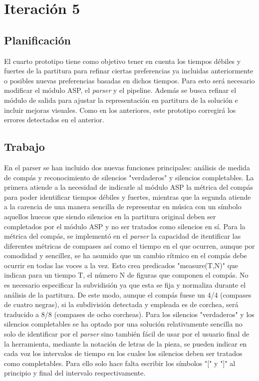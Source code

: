 \section{Iteración 5}
\subsection{Planificación}
El cuarto prototipo tiene como objetivo tener en cuenta los tiempos débiles y fuertes de la partitura para refinar ciertas preferencias ya incluidas anteriormente o posibles nuevas preferencias basadas en dichos tiempos. Para esto será necesario modificar el módulo ASP, el \textit{parser} y el pipeline. Además se busca refinar el módulo de salida para ajustar la representación en partitura de la solución e incluir mejoras visuales. Como en los anteriores, este prototipo corregirá los errores detectados en el anterior.

\subsection{Trabajo}
En el parser se han incluido dos nuevas funciones principales: análisis de medida de compás y reconocimiento de silencios "verdaderos" y silencios completables. La primera atiende a la necesidad de indicarle al módulo ASP la métrica del compás para poder identificar tiempos débiles y fuertes, mientras que la segunda atiende a la carencia de una manera sencilla de representar en música con un símbolo aquellos huecos que siendo silencios en la partitura original deben ser completados por el módulo ASP y no ser tratados como silencios en sí. Para la métrica del compás, se implementó en el \textit{parser} la capacidad de itentificar las diferentes métricas de compases así como el tiempo en el que ocurren, aunque por comodidad y sencillez, se ha asumido que un cambio rítmico en el compás debe ocurrir en todas las voces a la vez. Esto crea predicados "measure(T,N)" que indican para un tiempo T, el número N de figuras que componen el compás. No es necesario especificar la subvidisión ya que esta se fija y normaliza durante el análisis de la partitura. De este modo, aunque el compás fuese un 4/4 (compases de cuatro negras), si la subdivisión detectada y empleada es de corchea, será traducido a 8/8 (compases de ocho corcheas). Para los silencios "verdaderos" y los silencios completables se ha optado por una solución relativamente sencilla no solo de identificar por el \textit{parser} sino también fácil de usar por el usuario final de la herramienta, mediante la notación de letras de la pieza, se pueden indicar en cada voz los intervalos de tiempo en los cuales los silencios deben ser tratados como completables. Para ello solo hace falta escribir los símbolos "[" y "]" al principio y final del intervalo respectivamente.

